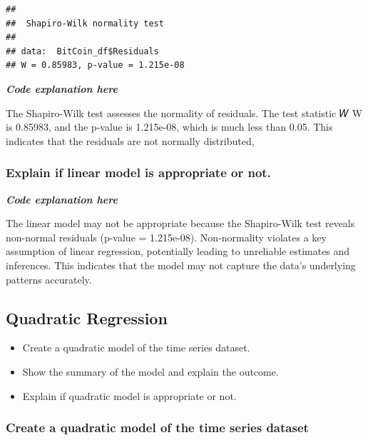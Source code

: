 \documentclass[
]{book}
\providecommand{\tightlist}{%
  \setlength{\itemsep}{0pt}\setlength{\parskip}{0pt}}
\begin{document}
\begin{verbatim}
## 
##  Shapiro-Wilk normality test
## 
## data:  BitCoin_df$Residuals
## W = 0.85983, p-value = 1.215e-08
\end{verbatim}

\emph{\textbf{Code explanation here}}

The Shapiro-Wilk test assesses the normality of residuals. The test statistic
𝑊
W is 0.85983, and the p-value is 1.215e-08, which is much less than 0.05. This indicates that the residuals are not normally distributed,

\subsubsection{Explain if linear model is appropriate or not.}\label{explain-if-linear-model-is-appropriate-or-not.}

\emph{\textbf{Code explanation here}}

The linear model may not be appropriate because the Shapiro-Wilk test reveals non-normal residuals (p-value = 1.215e-08). Non-normality violates a key assumption of linear regression, potentially leading to unreliable estimates and inferences. This indicates that the model may not capture the data's underlying patterns accurately.

\subsection{Quadratic Regression}\label{quadratic-regression}

\begin{itemize}
\tightlist
\item
  Create a quadratic model of the time series dataset.
\item
  Show the summary of the model and explain the outcome.
\item
  Explain if quadratic model is appropriate or not.
\end{itemize}

\subsubsection{Create a quadratic model of the time series dataset}\label{create-a-quadratic-model-of-the-time-series-dataset}
\end{document}
